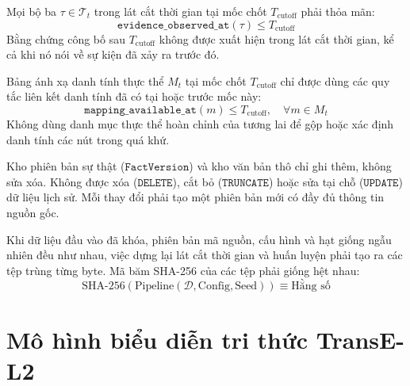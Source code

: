 \begin{axiom}
Mọi bộ ba $\tau \in \mathcal{T}_t$ trong lát cắt thời gian tại mốc chốt $T_{\text{cutoff}}$ phải thỏa mãn:
\begin{equation}
\texttt{evidence\_observed\_at}(\tau) \le T_{\text{cutoff}}
\end{equation}
Bằng chứng công bố sau $T_{\text{cutoff}}$ không được xuất hiện trong lát cắt thời gian, kể cả khi nó nói về sự kiện đã xảy ra trước đó.
\end{axiom}

\begin{axiom}
Bảng ánh xạ danh tính thực thể $M_t$ tại mốc chốt $T_{\text{cutoff}}$ chỉ được dùng các quy tắc liên kết danh tính đã có tại hoặc trước mốc này:
\begin{equation}
\texttt{mapping\_available\_at}(m) \le T_{\text{cutoff}}, \quad \forall m \in M_t
\end{equation}
Không dùng danh mục thực thể hoàn chỉnh của tương lai để gộp hoặc xác định danh tính các nút trong quá khứ.
\end{axiom}

\begin{axiom}
Kho phiên bản sự thật ($\texttt{FactVersion}$) và kho văn bản thô chỉ ghi thêm, không sửa xóa. Không được xóa ($\texttt{DELETE}$), cắt bỏ ($\texttt{TRUNCATE}$) hoặc sửa tại chỗ ($\texttt{UPDATE}$) dữ liệu lịch sử. Mỗi thay đổi phải tạo một phiên bản mới có đầy đủ thông tin nguồn gốc.
\end{axiom}

\begin{axiom}
Khi dữ liệu đầu vào đã khóa, phiên bản mã nguồn, cấu hình và hạt giống ngẫu nhiên đều như nhau, việc dựng lại lát cắt thời gian và huấn luyện phải tạo ra các tệp trùng từng byte. Mã băm SHA-256 của các tệp phải giống hệt nhau:
\begin{equation}
\text{SHA-256}\left(\text{Pipeline}(\mathcal{D}, \text{Config}, \text{Seed})\right) \equiv \text{Hằng số}
\end{equation}
\end{axiom}

\section{Mô hình biểu diễn tri thức TransE-L2}
\label{sec:transe_l2_kge}

